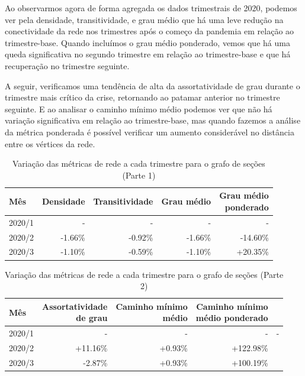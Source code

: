 Ao observarmos agora de forma agregada os dados trimestrais de 2020, podemos ver pela densidade, transitividade, e grau médio que há uma leve redução na conectividade da rede nos trimestres após o começo da pandemia em relação ao trimestre-base. Quando incluímos o grau médio ponderado, vemos que há uma queda significativa no segundo trimestre em relação ao trimestre-base e que há recuperação no trimestre seguinte.

A seguir, verificamos uma tendência de alta da assortatividade de grau durante o trimestre mais crítico da crise, retornando ao patamar anterior no trimestre seguinte. E ao analisar o caminho mínimo médio podemos ver que não há variação significativa em relação ao trimestre-base, mas quando fazemos a análise da métrica ponderada é possível verificar um aumento considerável no distância entre os vértices da rede.

\begin{table}[htb]
\centering
\caption{Variação das métricas de rede a cada trimestre para o grafo de seções (Parte 1)}
\label{tab:metricas-redes-pandemia:grafo-trimestral-por-secao1}
\begin{tabular}{l|rrrr}
\toprule
Mês & Densidade & Transitividade & Grau médio & \shortstack{Grau médio\\ponderado} \\
\midrule
2020/1 & - & - & - & - \\
2020/2 & -1.66\% & -0.92\% & -1.66\% & -14.60\% \\
2020/3 & -1.10\% & -0.59\% & -1.10\% & +20.35\% \\
\bottomrule
\end{tabular}
\fdadospesquisa
\end{table}

\begin{table}[htb]
\centering
\caption{Variação das métricas de rede a cada trimestre para o grafo de seções (Parte 2)}
\label{tab:metricas-redes-pandemia:grafo-trimestral-por-secao2}
\begin{tabular}{l|rrrr}
\toprule
Mês & \shortstack{Assortatividade\\de grau} & \shortstack{Caminho mínimo\\médio} & \shortstack{Caminho mínimo\\médio ponderado} \\
\midrule
2020/1 & - & - & - & - \\
2020/2 & +11.16\% & +0.93\% & +122.98\% \\
2020/3 &  -2.87\% & +0.93\% & +100.19\% \\
\bottomrule
\end{tabular}
\fdadospesquisa
\end{table}

